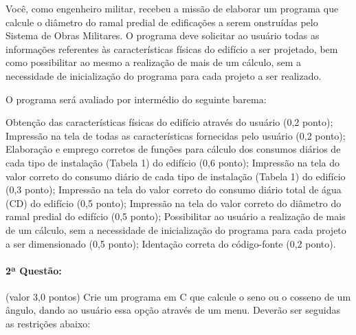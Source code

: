 \documentclass[12pt,a4paper]{article}
\begin{document}
Você, como engenheiro militar, recebeu a missão de elaborar um programa que calcule o diâmetro
do ramal predial de edificações a serem onstruídas pelo Sistema de Obras Militares. O programa deve solicitar ao usuário todas as informações referentes às características físicas do edifício a ser projetado, bem como possibilitar ao mesmo a realização de mais de um cálculo, sem a necessidade de inicialização do programa para cada projeto a ser realizado.

O programa será avaliado por intermédio do seguinte barema:

\begin{tasks}
\task Obtenção das características físicas do edifício através do usuário (0,2 ponto);
\task Impressão na tela de todas as características fornecidas pelo usuário (0,2 ponto);
\task Elaboração e emprego corretos de funções para cálculo dos consumos diários de cada tipo de instalação (Tabela 1) do edifício (0,6 ponto);
\task Impressão na tela do valor correto do consumo diário de cada tipo de instalação (Tabela 1) do edifício (0,3 ponto);
\task Impressão na tela do valor correto do consumo diário total de água (CD) do edifício (0,5 ponto);
\task Impressão na tela do valor correto do diâmetro do ramal predial do edifício (0,5 ponto);
\task Possibilitar ao usuário a realização de mais de um cálculo, sem a necessidade de inicialização do programa para cada projeto a ser dimensionado (0,5 ponto);
\task Identação correta do código-fonte (0,2 ponto).
\end{tasks}

\paragraph{2ª Questão:} (valor 3,0 pontos) Crie um programa em C que calcule o seno ou o cosseno de um ângulo, dando ao usuário essa opção através de um menu. Deverão ser seguidas as restrições abaixo:
\end{document}
